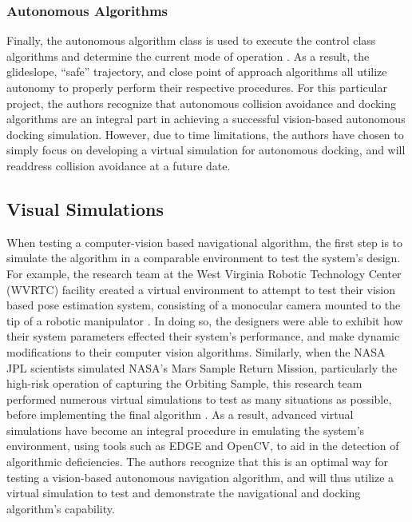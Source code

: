 \documentclass[journal, 10pt]{IEEEtran}
\begin{document}
\subsubsection{Autonomous Algorithms}
Finally, the autonomous algorithm class is used to execute the control class algorithms and determine the current mode of operation \cite{SPHERES_form}. As a result, the glideslope, ``safe'' trajectory, and close point of approach algorithms all utilize autonomy to properly perform their respective procedures. For this particular project, the authors recognize that autonomous collision avoidance and docking algorithms are an integral part in achieving a successful vision-based autonomous docking simulation. However, due to time limitations, the authors have chosen to simply focus on developing a virtual simulation for autonomous docking, and will readdress collision avoidance at a future date.

\subsection{Visual Simulations}

When testing a computer-vision based navigational algorithm, the first step is to simulate the algorithm in a comparable environment to test the system's design. For example, the research team at the West Virginia Robotic Technology Center (WVRTC) facility created a virtual environment to attempt to test their vision based pose estimation system, consisting of a monocular camera mounted to the tip of a robotic manipulator  \cite{virt_sim}. In doing so, the designers were able to exhibit how their system parameters effected their system's performance, and make dynamic modifications to their computer vision algorithms. Similarly, when the NASA JPL scientists simulated NASA's Mars Sample Return Mission, particularly the high-risk operation of capturing the Orbiting Sample, this research team performed numerous virtual simulations to test as many situations as possible, before implementing the final algorithm \cite{mars}. As a result, advanced virtual simulations have become an integral procedure in emulating the system's environment, using tools such as EDGE and OpenCV, to aid in the detection of algorithmic deficiencies. The authors recognize that this is an optimal way for testing a vision-based autonomous navigation algorithm, and will thus utilize a virtual simulation to test and demonstrate the navigational and docking algorithm's capability.
\end{document}
